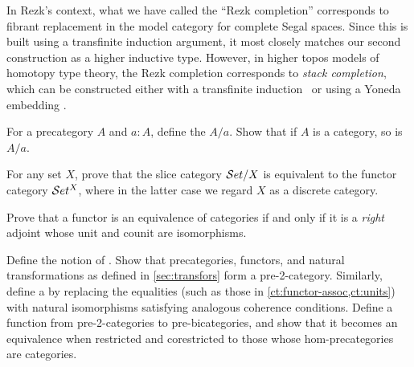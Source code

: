 In Rezk's context, what we have called the ``Rezk completion'' corresponds to fibrant replacement
in the model category for complete Segal spaces.
Since this is built using a transfinite induction argument, it most closely matches our second construction as a higher inductive type.
However, in higher topos models of homotopy type theory, the Rezk completion corresponds to \emph{stack completion}, which can be constructed either with a transfinite induction~\cite{jt:strong-stacks} or using a Yoneda embedding \cite{bunge:stacks-morita-internal}.


\sectionExercises

\begin{ex}\label{ex:slice-precategory}
  For a precategory $A$ and $a:A$, define the  $A/a$.
  Show that if $A$ is a category, so is $A/a$.
\end{ex}

\begin{ex}\label{ex:set-slice-over-equiv-functor-category}
  For any set $X$, prove that the slice category $\mathcal{S}et/X$ is equivalent to the functor category $\mathcal{S}et^X$, where in the latter case we regard $X$ as a discrete category.
\end{ex}

\begin{ex}\label{ex:functor-equiv-right-adjoint}
  Prove that a functor is an equivalence of categories if and only if it is a \emph{right} adjoint whose unit and counit are isomorphisms.
\end{ex}

\begin{ex}\label{ct:pre2cat}
  Define the notion of .
  Show that precategories, functors, and natural transformations as defined in \cref{sec:transfors} form a pre-2-category.
  Similarly, define a 
  by replacing the equalities (such as those in \cref{ct:functor-assoc,ct:units}) with natural isomorphisms satisfying analogous coherence conditions.
  Define a function from pre-2-categories to pre-bicategories, and show that it becomes an equivalence when restricted and corestricted to those whose hom-pre\-cat\-egories are categories.
\end{ex}

